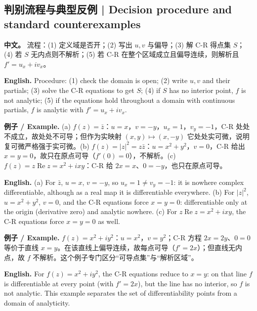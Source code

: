 \documentclass[UTF8,11pt,a4paper]{ctexart}
\newcommand{\EN}[1]{\par\noindent \textbf{English.} #1\par}
\newcommand{\EX}[2]{\par\noindent \textbf{例子 / Example.} #1\par\EN{#2}}
\newcommand{\APS}[2]{\par\noindent\textbf{中文。} #1\par\noindent\textbf{English.} #2\par\smallskip}
\begin{document}
\subsection{判别流程与典型反例 | Decision procedure and standard counterexamples}
\APS{流程：(1) 定义域是否开；(2) 写出 $u,v$ 与偏导；(3) 解 C-R 得点集 $S$；(4) 若 $S$ 无内点则不解析；(5) 若 C-R 在整个区域成立且偏导连续，则解析且 $f'=u_x+iv_x$。}{Procedure: (1) check the domain is open; (2) write $u,v$ and their partials; (3) solve the C-R equations to get $S$; (4) if $S$ has no interior point, $f$ is not analytic; (5) if the equations hold throughout a domain with continuous partials, $f$ is analytic with $f'=u_x+iv_x$.}
\EX{(a) $f(z)=\bar z$：$u=x$，$v=-y$，$u_x=1$，$v_y=-1$，C-R 处处不成立，故处处不可导；但作为实映射 $(x,y)\mapsto(x,-y)$ 它处处实可微，说明复可微严格强于实可微。(b) $f(z)=|z|^2=z\bar z$：$u=x^2+y^2$，$v=0$，C-R 给出 $x=y=0$，故只在原点可导（$f'(0)=0$），不解析。(c) $f(z)=z\operatorname{Re}z=x^2+ixy$：C-R 给 $2x=x$、$0=-y$，也只在原点可导。}{(a) For $\bar z$, $u=x$, $v=-y$, so $u_x=1\ne v_y=-1$: it is nowhere complex differentiable, although as a real map it is differentiable everywhere. (b) For $|z|^2$, $u=x^2+y^2$, $v=0$, and the C-R equations force $x=y=0$: differentiable only at the origin (derivative zero) and analytic nowhere. (c) For $z\operatorname{Re}z=x^2+ixy$, the C-R equations force $x=y=0$ as well.}
\EX{$f(z)=x^2+iy^2$：$u=x^2$，$v=y^2$；C-R 方程 $2x=2y$、$0=0$ 等价于直线 $x=y$。在该直线上偏导连续，故每点可导（$f'=2x$）；但直线无内点，故 $f$ 不解析。这个例子专门区分“可导点集”与“解析区域”。}{For $f(z)=x^2+iy^2$, the C-R equations reduce to $x=y$: on that line $f$ is differentiable at every point (with $f'=2x$), but the line has no interior, so $f$ is not analytic. This example separates the set of differentiability points from a domain of analyticity.}
\end{document}
